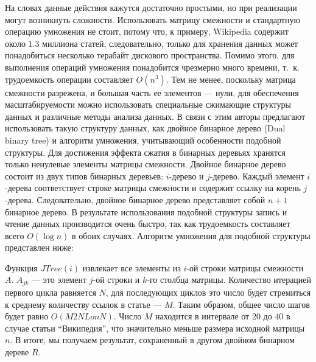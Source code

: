 На словах данные действия кажутся достаточно простыми, но при реализации могут возникнуть сложности. 
Использовать матрицу смежности и стандартную операцию умножения не стоит, потому что,
к примеру, Wikipedia содержит около 1.3 миллиона статей, 
следовательно,  только для хранения данных может понадобиться несколько терабайт дискового пространства. 
Помимо этого, для выполнения операций умножения
понадобится чрезмерно много времени, т.~к. трудоемкость операции составляет $O(n^3)$.
Тем не менее, поскольку матрица смежности разрежена, и большая часть ее элементов --- нули, 
для обеспечения масштабируемости можно использовать специальные сжимающие структуры данных и различные методы анализа данных. 
В связи с этим авторы предлагают использовать такую структуру данных, как двойное бинарное дерево (Dual binary tree) и алгоритм умножения, 
учитывающий особенности подобной структуры.
Для достижения эффекта сжатия в бинарных деревьях хранятся только ненулевые элементы матрицы 
смежности. Двойное бинарное дерево состоит из двух типов бинарных деревьев: 
$i$-дерево и $j$-дерево.
Каждый элемент $i$-дерева соответствует строке матрицы смежности и содержит ссылку на корень $j$-дерева.
Следовательно, двойное бинарное дерево представляет собой $n+1$ бинарное дерево.  %
В результате использования подобной структуры запись и чтение данных производится очень быстро, так как
трудоемкость составляет всего $O(\log n)$ в обоих случаях.
Алгоритм умножения для подобной структуры представлен ниже:



Функция $JTree(i)$ извлекает все элементы из $i$-ой строки матрицы смежности $A$.
$A_{jk}$ --- это элемент $j$-ой строки и $k$-го столбца матрицы. 
Количество итерацией первого цикла равняется $N$, для последующих циклов это число будет стремиться к среднему 
количеству ссылок в статье --- $M$. 
Таким образом, общее число шагов будет равно $O(M2NLonN)$. %
Число $M$ находится в интервале от 20 до 40 в случае статьи ``Википедия'', %
что значительно меньше размера исходной матрицы $n$. В итоге, мы получаем результат, 
сохраненный в другом двойном бинарном дереве $R$.

